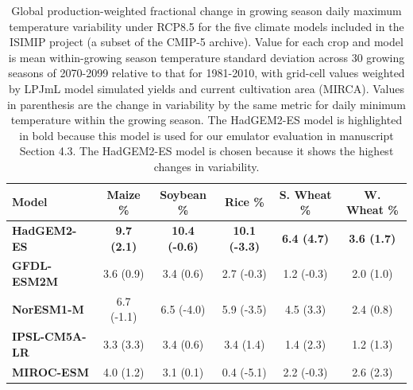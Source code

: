 \documentclass[12pt]{article}
\begin{document}
\begin{table}[ht]
{\small
    \caption{
	    Global production-weighted fractional change in growing season daily maximum temperature variability under RCP8.5 for the five climate models included in the ISIMIP project (a subset of the CMIP-5 archive). 
    Value for each crop and model is mean within-growing season temperature standard deviation across 30 growing seasons of 2070-2099 relative to that for 1981-2010, with grid-cell values weighted by 
	   LPJmL model simulated yields and current cultivation area (MIRCA).
    Values in parenthesis are the change in variability by the same metric for daily minimum temperature within the growing season.
    The HadGEM2-ES model is highlighted in bold because this model is used for our emulator evaluation in manuscript Section 4.3. The HadGEM2-ES model is chosen because it shows the highest changes in variability.
    }
    \begin{tabular}{l | c | c | c | c | c} 
        \hline
        \textbf{Model}        & \textbf{Maize \%} & \textbf{Soybean \%} & \textbf{Rice \%} & \textbf{S. Wheat \%} & \textbf{W. Wheat \%} \\ \hline
        \textbf{HadGEM2-ES}   & \textbf{9.7 (2.1)}  & \textbf{10.4 (-0.6)}  & \textbf{10.1 (-3.3)}  & \textbf{6.4 (4.7)}  & \textbf{3.6 (1.7)}  \\ \hline
        \textbf{GFDL-ESM2M}   & 3.6 (0.9)  & 3.4 (0.6)  & 2.7 (-0.3)  & 1.2 (-0.3) & 2.0 (1.0)  \\ \hline
        \textbf{NorESM1-M}    & 6.7 (-1.1)  & 6.5 (-4.0)  & 5.9 (-3.5)  & 4.5 (3.3)  & 2.4 (0.8)    \\ \hline
        \textbf{IPSL-CM5A-LR} & 3.3 (3.3)  & 3.4 (0.6)  & 3.4 (1.4)  & 1.4 (2.3)  & 1.2 (1.3)  \\ \hline
        \textbf{MIROC-ESM}    & 4.0 (1.2)  & 3.1 (0.1)  & 0.4 (-5.1)  & 2.2 (-0.3)  & 2.6 (2.3)  \\ \hline
    \end{tabular}
}
\end{table}
\end{document}
